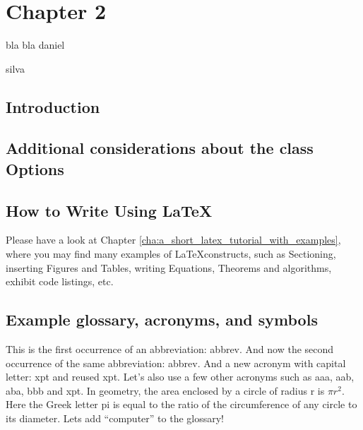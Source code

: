 


\chapter{Chapter 2}\label{cha:users_manual}

\glsresetall
bla bla
daniel

silva
\section{Introduction}\label{sec:sec_2_1}

\section{Additional considerations about the class Options}\label{sec:additional_considerations}

\section{How to Write Using \LaTeX}\label{sec:how_to_write_using_latex}

Please have a look at Chapter \ref{cha:a_short_latex_tutorial_with_examples}, where you may find many examples of \LaTeX constructs, such as Sectioning, inserting Figures and Tables, writing Equations, Theorems and algorithms, exhibit code listings, etc.

\section{Example glossary, acronyms, and symbols}

This is the first occurrence of an abbreviation: \gls{abbrev}. And now the second occurrence of the same abbreviation: \gls{abbrev}. And a new acronym with capital letter: \Gls{xpt} and reused \gls{xpt}.  Let's also use a few other acronyms such as \gls{aaa}, \gls{aab}, \gls{aba}, \gls{bbb} and \gls{xpt}.
In geometry, the area enclosed by a circle of radius \gls{r} is $\pi r^2$. Here the Greek letter \gls{pi} is equal to the ratio of the circumference of any circle to its diameter.
Lets add ``\gls{computer}'' to the glossary!

